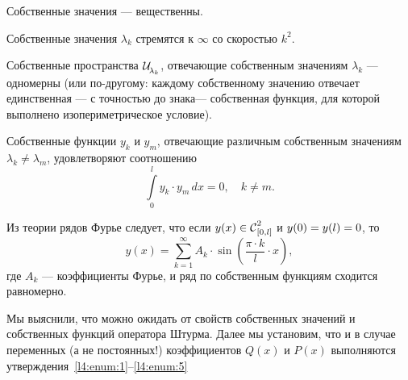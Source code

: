 \begin{enumerateD}
	\item\label{l4:enum:1} Собственные значения --- вещественны.
	\item Собственные значения $\lambda_k$ стремятся к $\infty$ со скоростью $k^2$.
	\item Собственные пространства $\displaystyle \Ul[\lambda_k]$, отвечающие собственным значениям $\lambda_k$ --- одномерны (или по-другому: каждому собственному значению отвечает единственная --- с точностью до знака--- собственная функция, для которой выполнено изопериметрическое условие).
	\item Собственные функции $y_k$ и $y_m$, отвечающие различным собственным значениям $\lambda_k\neq\lambda_m${\mb,} удовлетворяют соотношению
	\begin{equation*}
		\int\limits_0^l y_k\cdot y_m\,dx=0,\quad k\neq m.
	\end{equation*}
	\item\label{l4:enum:5} Из теории рядов Фурье следует, что если $y(x)\in\Cfn[{[0,l]}]{2}$ и $y(0)\?=y(l)=0$, то 
	\begin{equation*}
		 y(x)=\sum\limits_{k=1}^{\infty} A_k\cdot\sin\left(\frac{\pi\cdot k}{l}\cdot x\right),
	\end{equation*}
	где $A_k$ --- коэффициенты Фурье{\mb,} и ряд по собственным функциям сходится равномерно. 
\end{enumerateD}

Мы выяснили, что можно ожидать от свойств собственных значений и собственных функций оператора Штурма. Далее мы установим, что и в случае переменных (а не постоянных!) коэффициентов $Q(x)$ и $P(x)$ выполняются утверждения~\ref{l4:enum:1}--\ref{l4:enum:5}
